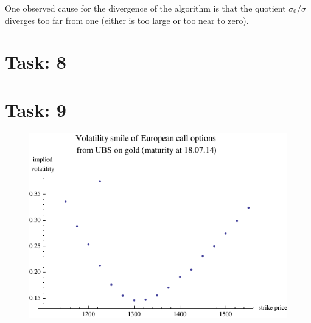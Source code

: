 \documentclass{article}
\begin{document}
One observed cause for the divergence of the algorithm is that the quotient $\sigma_0 / \sigma$ diverges too far from one (either is too large or too near to zero).

\section*{Task: 8}

\section*{Task: 9}

\begin{figure}[htbp]
  \centering
     \includegraphics[width=1.0\textwidth]{../Task09/smileFromExternalData.pdf}
\end{figure}
\end{document}

